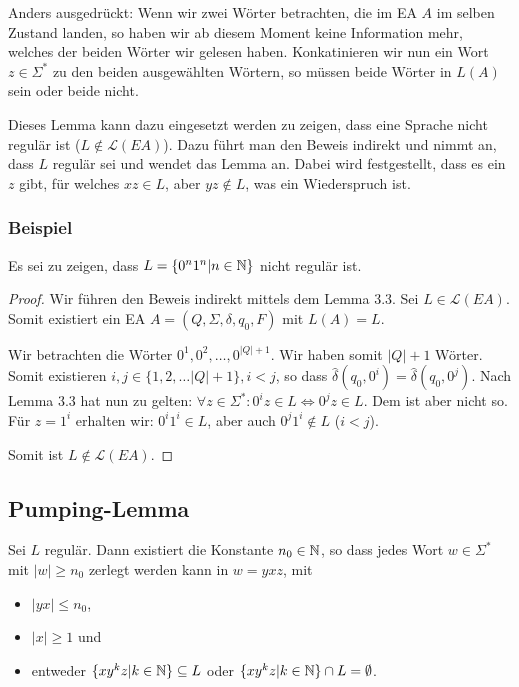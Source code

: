 Anders ausgedrückt: Wenn wir zwei Wörter betrachten, die im EA $A$ im selben Zustand landen, so haben wir ab diesem Moment keine Information mehr, welches der beiden Wörter wir gelesen haben. Konkatinieren wir nun ein Wort $z \in \Sigma^*$ zu den beiden ausgewählten Wörtern, so müssen beide Wörter in $L(A)$ sein oder beide nicht.

Dieses Lemma kann dazu eingesetzt werden zu zeigen, dass eine Sprache nicht regulär ist ($L \not\in \mathcal{L}(EA)$). Dazu führt man den Beweis indirekt und nimmt an, dass $L$ regulär sei und wendet das Lemma an. Dabei wird festgestellt, dass es ein $z$ gibt, für welches $xz \in L$, aber $yz \not\in L$, was ein Wiederspruch ist.

\subsubsection{Beispiel}
Es sei zu zeigen, dass $L = \{0^n1^n | n \in \mathbb{N}\}$ nicht regulär ist.
\begin{proof}
Wir führen den Beweis indirekt mittels dem Lemma 3.3. Sei $L \in \mathcal{L}(EA)$. Somit existiert ein EA $A = (Q, \Sigma, \delta, q_0, F)$ mit $L(A) = L$.

Wir betrachten die Wörter $0^1, 0^2, \ldots, 0^{|Q|+1}$. Wir haben somit $|Q| + 1$ Wörter. Somit existieren $i, j \in \{1, 2, \ldots |Q| + 1\}, i < j$, so dass $\hat\delta(q_0, 0^i) = \hat\delta(q_0, 0^j)$. Nach Lemma 3.3 hat nun zu gelten: $\forall z \in \Sigma^*: 0^i z \in L \Leftrightarrow 0^j z \in L$. Dem ist aber nicht so. Für $z = 1^i$ erhalten wir: $0^i 1^i \in L$, aber auch $0^j 1^i \not\in L$ ($i < j$).

Somit ist $L \not\in \mathcal{L}(EA)$.
\end{proof}

\subsection{Pumping-Lemma}
\begin{lemma}
Sei $L$ regulär. Dann existiert die Konstante $n_0 \in \mathbb{N}$, so dass jedes Wort $w \in \Sigma^*$ mit $|w| \geq n_0$ zerlegt werden kann in $w = y x z$, mit
\begin{itemize}
  \item $|yx| \leq n_0$,
  \item $|x| \geq 1$ und
  \item entweder $\{xy^kz | k \in \mathbb{N}\} \subseteq L$ oder $\{xy^kz | k \in \mathbb{N} \} \cap L = \emptyset$.
\end{itemize}

\end{lemma}

